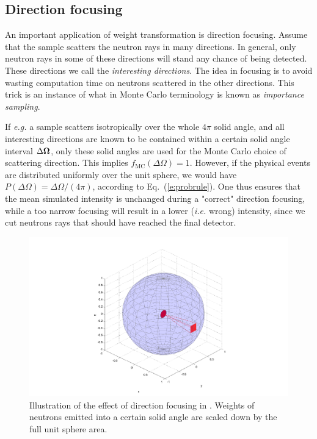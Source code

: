 \subsection{Direction focusing}
\label{s:focus}

An important application of weight transformation is direction focusing.
Assume that the sample scatters the neutron rays in many directions.
In general, only neutron rays in some of these directions will
stand any chance of being detected. These directions we call
the {\em interesting directions}.
The idea in focusing is to avoid wasting computation time on
neutrons scattered in the other directions.
This trick is an instance of what in Monte Carlo terminology
is known as {\em importance sampling}. %

If {\em e.g.} a sample scatters isotropically
over the whole $4\pi$ solid angle, and all interesting
directions are known to be contained within a certain
solid angle interval $\Delta \Ombold$, only these solid angles
are used for the Monte Carlo choice of scattering direction.
This implies $f_\mathrm{MC}(\Delta\Omega) = 1$. However, if the physical
events are distributed uniformly over the unit sphere, we would have
$P(\Delta\Omega) = \Delta\Omega / (4\pi)$, according to Eq.~(\ref{e:probrule}).
One thus ensures that the mean simulated intensity is unchanged
during a "correct" direction focusing, while a too narrow focusing will
result in a lower (\textit{i.e.} wrong) intensity, since
we cut neutrons rays that should have reached the final detector.

\begin{figure}[htb!]
\begin{center}
\includegraphics[width=.8\textwidth]{figures/focusing}
\end{center}
\caption{Illustration of the effect of direction focusing in \MCS.
  Weights of neutrons emitted into a certain solid angle are
  scaled down by the full unit sphere area.}
\label{fig:focusing}
\end{figure}

